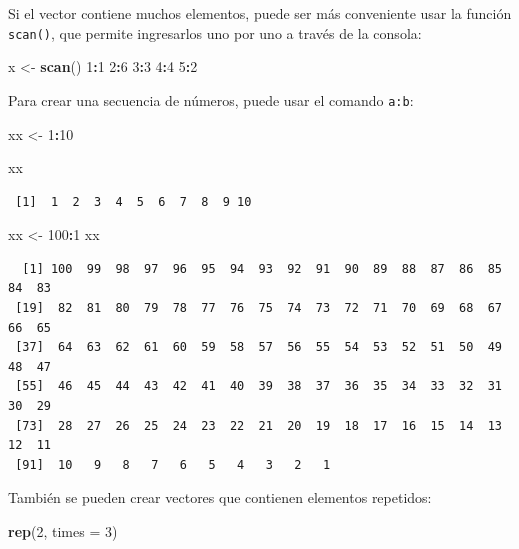 \documentclass[
]{article}
\newenvironment{Shaded}{\begin{snugshade}}{\end{snugshade}}
\newcommand{\AttributeTok}[1]{\textcolor[rgb]{0.13,0.29,0.53}{#1}}
\newcommand{\DecValTok}[1]{\textcolor[rgb]{0.00,0.00,0.81}{#1}}
\newcommand{\FunctionTok}[1]{\textcolor[rgb]{0.13,0.29,0.53}{\textbf{#1}}}
\newcommand{\NormalTok}[1]{#1}
\newcommand{\OtherTok}[1]{\textcolor[rgb]{0.56,0.35,0.01}{#1}}
\newcommand{\SpecialCharTok}[1]{\textcolor[rgb]{0.81,0.36,0.00}{\textbf{#1}}}
\begin{document}
Si el vector contiene muchos elementos, puede ser más conveniente usar la función \texttt{scan()}, que permite ingresarlos uno por uno a través de la consola:

\begin{Shaded}
\begin{Highlighting}[]
\NormalTok{x }\OtherTok{\textless{}{-}} \FunctionTok{scan}\NormalTok{()}
\DecValTok{1}\SpecialCharTok{:}\DecValTok{1}
\DecValTok{2}\SpecialCharTok{:}\DecValTok{6}
\DecValTok{3}\SpecialCharTok{:}\DecValTok{3}
\DecValTok{4}\SpecialCharTok{:}\DecValTok{4}
\DecValTok{5}\SpecialCharTok{:}\DecValTok{2}
\end{Highlighting}
\end{Shaded}

Para crear una secuencia de números, puede usar el comando \texttt{a:b}:

\begin{Shaded}
\begin{Highlighting}[]
\NormalTok{xx }\OtherTok{\textless{}{-}} \DecValTok{1}\SpecialCharTok{:}\DecValTok{10}

\NormalTok{xx}
\end{Highlighting}
\end{Shaded}

\begin{verbatim}
 [1]  1  2  3  4  5  6  7  8  9 10
\end{verbatim}

\begin{Shaded}
\begin{Highlighting}[]
\NormalTok{xx }\OtherTok{\textless{}{-}} \DecValTok{100}\SpecialCharTok{:}\DecValTok{1}
\NormalTok{xx}
\end{Highlighting}
\end{Shaded}

\begin{verbatim}
  [1] 100  99  98  97  96  95  94  93  92  91  90  89  88  87  86  85  84  83
 [19]  82  81  80  79  78  77  76  75  74  73  72  71  70  69  68  67  66  65
 [37]  64  63  62  61  60  59  58  57  56  55  54  53  52  51  50  49  48  47
 [55]  46  45  44  43  42  41  40  39  38  37  36  35  34  33  32  31  30  29
 [73]  28  27  26  25  24  23  22  21  20  19  18  17  16  15  14  13  12  11
 [91]  10   9   8   7   6   5   4   3   2   1
\end{verbatim}

También se pueden crear vectores que contienen elementos repetidos:

\begin{Shaded}
\begin{Highlighting}[]
\FunctionTok{rep}\NormalTok{(}\DecValTok{2}\NormalTok{, }\AttributeTok{times =} \DecValTok{3}\NormalTok{)}
\end{Highlighting}
\end{Shaded}
\end{document}
